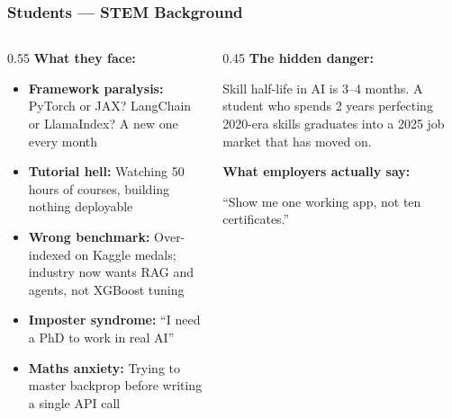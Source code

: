 \begin{frame}[fragile]\frametitle{Students --- STEM Background}

\begin{columns}
    \begin{column}[T]{0.55\linewidth}
\textbf{What they face:}
\begin{itemize}
\item \textbf{Framework paralysis:} PyTorch or JAX? LangChain or LlamaIndex? A new one every month
\item \textbf{Tutorial hell:} Watching 50 hours of courses, building nothing deployable
\item \textbf{Wrong benchmark:} Over-indexed on Kaggle medals; industry now wants RAG and agents, not XGBoost tuning
\item \textbf{Imposter syndrome:} ``I need a PhD to work in real AI''
\item \textbf{Maths anxiety:} Trying to master backprop before writing a single API call
\end{itemize}
    \end{column}
    \begin{column}[T]{0.45\linewidth}
\textbf{The hidden danger:}

Skill half-life in AI is 3--4 months. A student who spends 2 years perfecting 2020-era skills graduates into a 2025 job market that has moved on.

\vspace{0.3cm}
\textbf{What employers actually say:}

``Show me one working app, not ten certificates.''
    \end{column}
\end{columns}

\end{frame}



